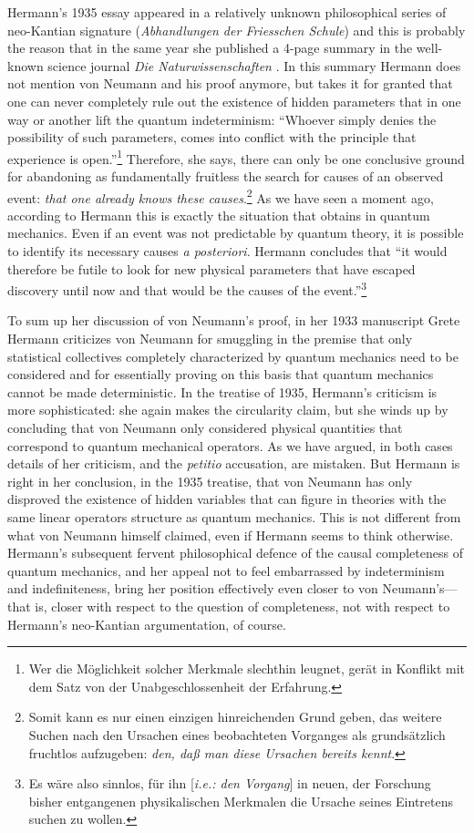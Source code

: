 \documentclass[12pt]{article}
\begin{document}
Hermann's 1935 essay appeared in a relatively unknown philosophical series of neo-Kantian signature (\emph{Abhandlungen der Friesschen Schule}) and this is probably the reason that in the same year she published a 4-page summary in the well-known science journal \emph{Die Naturwissenschaften} \cite{hermann2}. In this summary Hermann does not mention von Neumann and his proof anymore, but takes it for granted that one can never completely rule out the existence of hidden parameters that in one way or another lift the quantum indeterminism: ``Whoever simply denies the possibility of such parameters, comes into conflict with the principle that experience is open.''\footnote{Wer die M\"{o}glichkeit solcher Merkmale slechthin leugnet, ger\"{a}t in Konflikt mit dem Satz von der Unabgeschlossenheit der Erfahrung.} Therefore, she says, there can only be one conclusive ground for abandoning as fundamentally fruitless the search for causes of an observed event: \emph{that one already knows these causes}.\footnote{Somit kann es nur einen einzigen hinreichenden Grund geben, das weitere Suchen nach den Ursachen eines beobachteten Vorganges als grunds\"{a}tzlich fruchtlos aufzugeben: \emph{den, da{\ss} man diese Ursachen bereits kennt}.} As we have seen a moment ago, according to Hermann this is exactly the situation that obtains in quantum mechanics. Even if an event was not predictable by quantum theory, it is possible to identify its necessary causes \emph{a posteriori}. Hermann concludes that ``it would therefore be futile to look for new physical parameters that have escaped discovery until now and that would be the causes of the event.''\footnote{Es w\"{a}re also sinnlos, f\"{u}r ihn [\emph{i.e.: den Vorgang}] in neuen, der Forschung bisher entgangenen physikalischen Merkmalen die Ursache seines Eintretens suchen zu wollen.}

To sum up her discussion of von Neumann's proof, in her 1933 manuscript Grete Hermann criticizes von Neumann for smuggling in the premise that only statistical collectives completely characterized by quantum mechanics need to be considered and for essentially proving on this basis that quantum mechanics cannot be made deterministic. In the treatise of 1935, Hermann's criticism is more sophisticated: she again makes the circularity claim, but she winds up by concluding that von Neumann only considered physical quantities that correspond to  quantum mechanical operators. As we have argued, in both cases details of her criticism, and the \emph{petitio} accusation, are mistaken. But Hermann is right in her conclusion, in the 1935 treatise, that von Neumann has only disproved the existence of hidden variables that can figure in theories with the same linear operators structure as quantum mechanics. This is not different from what von Neumann himself claimed, even if Hermann seems to think otherwise. Hermann's subsequent fervent philosophical defence of the causal completeness of quantum mechanics, and her appeal not to feel embarrassed by indeterminism and indefiniteness, bring her position effectively even closer to von Neumann's---that is, closer with respect to the question of completeness, not with respect to Hermann's neo-Kantian argumentation, of course.
\end{document}
